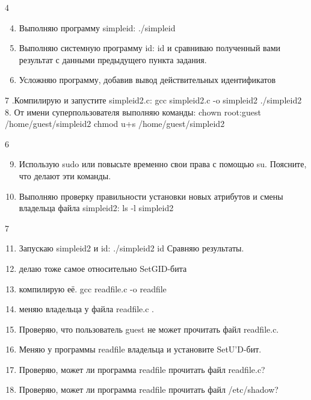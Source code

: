 \documentclass[
  ignorenonframetext,
  aspectratio=169,
]{beamer}
\providecommand{\tightlist}{%
  \setlength{\itemsep}{0pt}\setlength{\parskip}{0pt}}\usepackage{longtable,booktabs,array}
\begin{document}
\begin{frame}{4}
\label{section-3}
\begin{enumerate}[<+->]
\setcounter{enumi}{3}
\tightlist
\item
  Выполняю программу simpleid: ./simpleid
\item
  Выполняю системную программу id: id и сравниваю полученный вами
  результат с данными предыдущего пункта задания.
\item
  Усложняю программу, добавив вывод действительных идентификатов
\end{enumerate}
\end{frame}

\begin{frame}{7}
\label{section-4}
.Компилирую и запустите simpleid2.c: gcc simpleid2.c -o simpleid2
./simpleid2 8. От имени суперпользователя выполняю команды: chown
root:guest /home/guest/simpleid2 chmod u+s /home/guest/simpleid2
\end{frame}

\begin{frame}{6}
\label{section-5}
\begin{enumerate}[<+->]
\setcounter{enumi}{8}
\tightlist
\item
  Использую sudo или повысьте временно свои права с помощью su.
  Поясните, что делают эти команды.
\item
  Выполняю проверку правильности установки новых атрибутов и смены
  владельца файла simpleid2: ls -l simpleid2
\end{enumerate}
\end{frame}

\begin{frame}{7}
\label{section-6}
\begin{enumerate}[<+->]
\setcounter{enumi}{10}
\item
  Запускаю simpleid2 и id: ./simpleid2 id Сравняю результаты.
\item
  делаю тоже самое относительно SetGID-бита
\item
  компилирую её. gcc readfile.c -o readfile
\item
  меняю владельца у файла readfile.c .
\item
  Проверяю, что пользователь guest не может прочитать файл readfile.c.
\item
  Меняю у программы readfile владельца и установите SetU'D-бит.
\item
  Проверяю, может ли программа readfile прочитать файл readfile.c?
\item
  Проверяю, может ли программа readfile прочитать файл /etc/shadow?
\end{enumerate}
\end{frame}
\end{document}
